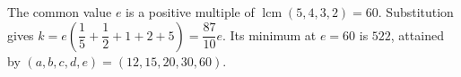 The common value $e$ is a positive multiple of $\operatorname{lcm}(5,4,3,2)=60$. Substitution gives $k=e\left(\dfrac{1}{5}+\dfrac{1}{2}+1+2+5\right)=\dfrac{87}{10}e$. Its minimum at $e=60$ is $\boxed{522}$, attained by $(a,b,c,d,e)=(12,15,20,30,60)$.
